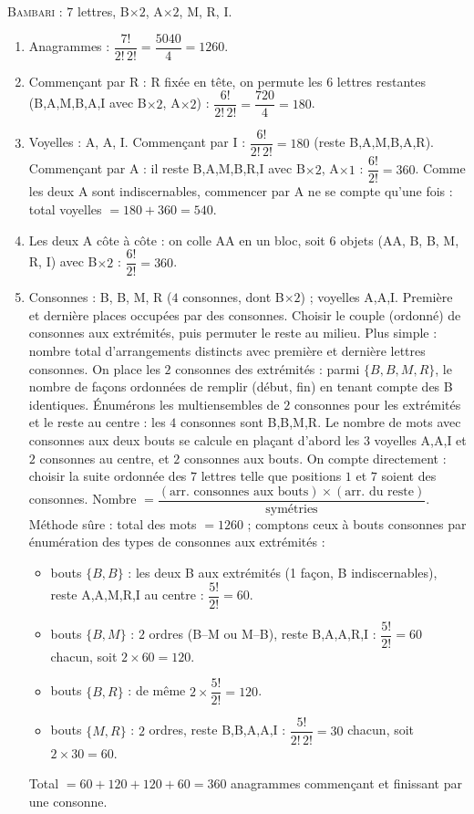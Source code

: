 \textsc{Bambari} : $7$ lettres, B$\times2$, A$\times2$, M, R, I.
\begin{enumerate}[label=\arabic*)]
\item Anagrammes : $\dfrac{7!}{2!\,2!}=\dfrac{5040}{4}=1260$.
\item Commençant par R : R fixée en tête, on permute les $6$ lettres restantes
(B,A,M,B,A,I avec B$\times2$, A$\times2$) : $\dfrac{6!}{2!\,2!}=\dfrac{720}{4}=180$.
\item Voyelles : A, A, I. Commençant par I : $\dfrac{6!}{2!\,2!}=180$ (reste B,A,M,B,A,R).
Commençant par A : il reste B,A,M,B,R,I avec B$\times2$, A$\times1$ : $\dfrac{6!}{2!}=360$.
Comme les deux A sont indiscernables, \og commencer par A \fg{} ne se compte qu'une fois :
total voyelles $=180+360=540$.
\item Les deux A côte à côte : on colle \og AA \fg{} en un bloc, soit $6$ objets
(AA, B, B, M, R, I) avec B$\times2$ : $\dfrac{6!}{2!}=360$.
\item Consonnes : B, B, M, R ($4$ consonnes, dont B$\times2$) ; voyelles A,A,I.
Première et dernière places occupées par des consonnes. Choisir le couple
(ordonné) de consonnes aux extrémités, puis permuter le reste au milieu. Plus simple :
nombre total d'arrangements distincts avec première et dernière lettres consonnes. On place
les $2$ consonnes des extrémités : parmi $\{B,B,M,R\}$, le nombre de façons ordonnées de
remplir (début, fin) en tenant compte des B identiques. Énumérons les multiensembles de
$2$ consonnes pour les extrémités et le reste au centre :
les $4$ consonnes sont B,B,M,R. Le nombre de mots avec consonnes aux deux bouts se calcule
en plaçant d'abord les $3$ voyelles A,A,I et $2$ consonnes au centre, et $2$ consonnes aux
bouts. On compte directement : choisir la suite ordonnée des $7$ lettres telle que
positions $1$ et $7$ soient des consonnes. Nombre $=\dfrac{(\text{arr. consonnes aux bouts})\times(\text{arr. du reste})}{\text{symétries}}$.
Méthode sûre : total des mots $=1260$ ; comptons ceux à bouts consonnes par énumération
des types de consonnes aux extrémités :
\begin{itemize}
\item bouts $\{B,B\}$ : les deux B aux extrémités (1 façon, B indiscernables), reste
A,A,M,R,I au centre : $\dfrac{5!}{2!}=60$.
\item bouts $\{B,M\}$ : $2$ ordres (B–M ou M–B), reste B,A,A,R,I : $\dfrac{5!}{2!}=60$
chacun, soit $2\times60=120$.
\item bouts $\{B,R\}$ : de même $2\times\dfrac{5!}{2!}=120$.
\item bouts $\{M,R\}$ : $2$ ordres, reste B,B,A,A,I : $\dfrac{5!}{2!\,2!}=30$ chacun, soit
$2\times30=60$.
\end{itemize}
Total $=60+120+120+60=360$ anagrammes commençant et finissant par une consonne.
\end{enumerate}

